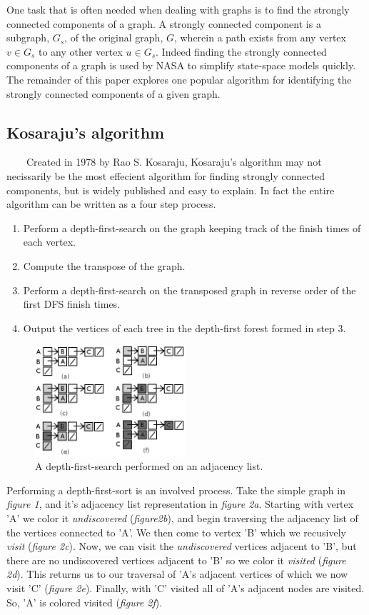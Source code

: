 \documentclass[12pt]{article}
\begin{document}
One task that is often needed when dealing with graphs is to find the strongly connected components of a graph. A strongly connected component is a subgraph, $ G_s $, of the original graph, $ G $, wherein a path exists from any vertex $ v \in G_s$ to any other vertex $ u \in G_s$. Indeed finding the strongly connected components of a graph is used by NASA to simplify state-space models quickly\cite{NASA}. The remainder of this paper explores one popular algorithm for identifying the strongly connected components of a given graph.

  \subsection{Kosaraju's algorithm}
\ \ \ \ Created in 1978 by Rao S. Kosaraju, Kosaraju's algorithm may not necissarily be the most effecient algorithm for finding strongly connected components, but is widely published and easy to explain. In fact the entire algorithm can be written as a four step process\cite{CLRS}\cite{Narahari}.

    \begin{enumerate}
      \item Perform a depth-first-search on the graph keeping track of the finish times of each vertex.
      \item Compute the transpose of the graph.
      \item Perform a depth-first-search on the transposed graph in reverse order of the first DFS finish times.
      \item Output the vertices of each tree in the depth-first forest formed in step 3.
    \end{enumerate}

\begin{figure}[h!]
  \centering
  \includegraphics[width=0.5\textwidth]{dfsadjacencylist.png}
    \caption{A depth-first-search performed on an adjacency list.}
\end{figure}

Performing a depth-first-sort is an involved process. Take the simple graph in \emph{figure 1}, and it's adjacency list representation in \emph{figure 2a}. Starting with vertex 'A' we color it \emph{undiscovered} (\emph{figure2b}), and begin traversing the adjacency list of the vertices connected to 'A'. We then come to vertex 'B' which we recusively \emph{visit} (\emph{figure 2c}). Now, we can visit the \emph{undiscovered} vertices adjacent to 'B', but there are no undiscovered vertices adjacent to 'B' so we color it \emph{visited} (\emph{figure 2d}). This returns us to our traversal of 'A's adjacent vertices of which we now visit 'C' (\emph{figure 2e}). Finally, with 'C' visited all of 'A's adjacent nodes are visited. So, 'A' is colored visited (\emph{figure 2f}).
\end{document}
